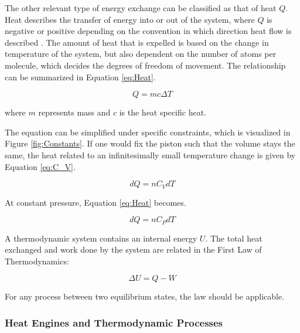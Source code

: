 The other relevant type of energy exchange can be classified as that of heat $\mathit{Q}$. Heat describes the transfer of energy into or out of the system, where $\mathit{Q}$ is negative or positive depending on the convention in which direction heat flow is described \cite{Ling2016-bs}. The amount of heat that is expelled is based on the change in temperature of the system, but also dependent on the number of atoms per molecule, which decides the degrees of freedom of movement. The relationship can be summarized in Equation \ref{eq:Heat}. \cite{Zohuri2019}

\begin{equation}
\label{eq:Heat}
    \mathit{Q = mc \Delta T}
\end{equation}

where $\mathit{m}$ represents mass and $\mathit{c}$ is the heat specific heat. 

The equation can be simplified under specific constraints, which is visualized in Figure \ref{fig:Constants}. If one would fix the piston such that the volume stays the same, the heat related to an infinitesimally small temperature change is given by Equation \ref{eq:C_V}. \cite{Zohuri2019}

\begin{equation}
\label{eq:C_V}
    \mathit{dQ = n C_V dT}
\end{equation}

At constant pressure, Equation \ref{eq:Heat} becomes. 

\begin{equation}
\label{eq:C_P}
    \mathit{dQ = n C_P dT}
\end{equation}

A thermodynamic system contains an internal energy $\mathit{U}$. The total heat exchanged and work done by the system are related in the First Law of Thermodynamics: 

\begin{equation}
\label{eq:1st Law}
    \mathit{\Delta U = Q - W}
\end{equation}

For any process between two equilibrium states, the law should be applicable. \cite{Ling2016-bs}


\subsubsection{Heat Engines and Thermodynamic Processes}
\label{Heat Engines}

